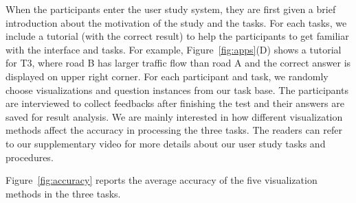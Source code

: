 When the participants enter the user study system, they are first given a brief introduction about the motivation of the study and the tasks. For each tasks, we include a tutorial (with the correct result) to help the participants to get familiar with the interface and tasks. For example, Figure~\ref{fig:apps}(D) shows a tutorial for T3, where road B has larger traffic flow than road A and the correct answer is displayed on upper right corner. For each participant and task, we randomly choose visualizations and question instances from our task base. The participants are interviewed to collect feedbacks after finishing the test and their answers are saved for result analysis. We are mainly interested in how different visualization methods affect the accuracy in processing the three tasks. The readers can refer to our supplementary video for more details about our user study tasks and procedures.




Figure~\ref{fig:accuracy} reports the average accuracy of the five visualization methods in the three tasks.



